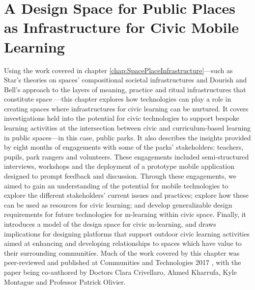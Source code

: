 \chapter{A Design Space for Public Places as Infrastructure for Civic Mobile Learning}

Using the work covered in chapter \ref{chap:SpacePlaceInfrastructure}---such as Star’s theories on spaces’ compositional societal infrastructures \citep{Star1999} and Dourish and Bell’s approach to the layers of meaning, practice and ritual infrastructures that constitute space \citep{Dourish2006}---this chapter explores how technologies can play a role in creating spaces where infrastructures for civic learning can be nurtured. It covers investigations held into the potential for civic technologies to support bespoke learning activities at the intersection between civic and curriculum-based learning in public spaces---in this case, public parks. It also describes the insights provided by eight months of engagements with some of the parks' stakeholders: teachers, pupils, park rangers and volunteers. These engagements included semi-structured interviews, workshops and the deployment of a prototype mobile application designed to prompt feedback and discussion. Through these engagements, we aimed to gain an understanding of the potential for mobile technologies to explore the different stakeholders' current issues and practices; explore how these can be used as resources for civic learning; and develop generalizable design requirements for future technologies for m-learning within civic space. Finally, it introduces a model of the design space for civic m-learning, and draws implications for designing platforms that support outdoor civic learning activities aimed at enhancing and developing relationships to spaces which have value to their surrounding communities. Much of the work covered by this chapter was peer-reviewed and published at Communities and Technologies 2017 \citep{Richardson2017}, with the paper being co-authored by Doctors Clara Crivellaro, Ahmed Kharrufa, Kyle Montague and Professor Patrick Olivier. 

